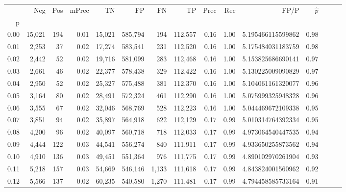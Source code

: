 \begin{tabular}{rrrrrrrrrrrrrrr}
\toprule
{} &     Neg &    Pos & mPrec &       TN &       FP &       FN &       TP &  Prec &   Rec &                  FP/P & $\hat{p}$ \\
p    &         &        &       &          &          &          &          &       &       &                       &           \\
\midrule
0.00 &  15,021 &    194 &  0.01 &   15,021 &  585,794 &      194 &  112,557 &  0.16 &  1.00 &     5.195466115599862 &      0.98 \\
0.01 &   2,253 &     37 &  0.02 &   17,274 &  583,541 &      231 &  112,520 &  0.16 &  1.00 &     5.175484031183759 &      0.98 \\
0.02 &   2,442 &     52 &  0.02 &   19,716 &  581,099 &      283 &  112,468 &  0.16 &  1.00 &     5.153825686690141 &      0.97 \\
0.03 &   2,661 &     46 &  0.02 &   22,377 &  578,438 &      329 &  112,422 &  0.16 &  1.00 &     5.130225009090829 &      0.97 \\
0.04 &   2,950 &     52 &  0.02 &   25,327 &  575,488 &      381 &  112,370 &  0.16 &  1.00 &     5.104061161320077 &      0.96 \\
0.05 &   3,164 &     80 &  0.02 &   28,491 &  572,324 &      461 &  112,290 &  0.16 &  1.00 &     5.075999325948328 &      0.96 \\
0.06 &   3,555 &     67 &  0.02 &   32,046 &  568,769 &      528 &  112,223 &  0.16 &  1.00 &     5.044469672109338 &      0.95 \\
0.07 &   3,851 &     94 &  0.02 &   35,897 &  564,918 &      622 &  112,129 &  0.17 &  0.99 &     5.010314764392334 &      0.95 \\
0.08 &   4,200 &     96 &  0.02 &   40,097 &  560,718 &      718 &  112,033 &  0.17 &  0.99 &     4.973064540447535 &      0.94 \\
0.09 &   4,444 &    122 &  0.03 &   44,541 &  556,274 &      840 &  111,911 &  0.17 &  0.99 &     4.933650255873562 &      0.94 \\
0.10 &   4,910 &    136 &  0.03 &   49,451 &  551,364 &      976 &  111,775 &  0.17 &  0.99 &     4.890102970261904 &      0.93 \\
0.11 &   5,218 &    157 &  0.03 &   54,669 &  546,146 &    1,133 &  111,618 &  0.17 &  0.99 &     4.843824001560962 &      0.92 \\
0.12 &   5,566 &    137 &  0.02 &   60,235 &  540,580 &    1,270 &  111,481 &  0.17 &  0.99 &     4.794458585733164 &      0.91 \\

\end{tabular}

